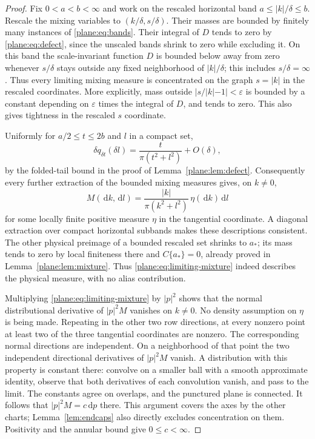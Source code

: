 \documentclass[11pt]{article}
\newcommand{\dd}{\,\mathrm d}
\theoremstyle{definition}
\theoremstyle{remark}
\numberwithin{equation}{section}
\begin{document}
\begin{proof}
Fix $0<a<b<\infty$ and work on the rescaled horizontal band
$a\le|k|/\delta\le b$.  Rescale the mixing variables to
$(k/\delta,s/\delta)$.  Their masses are bounded by finitely many
instances of \eqref{plane:eq:bands}.  Their integral of $D$ tends to
zero by \eqref{plane:eq:defect}, since the unscaled bands shrink to
zero while excluding it.  On this band the scale-invariant function
$D$ is bounded below away from zero whenever $s/\delta$ stays outside
any fixed neighborhood of $|k|/\delta$; this includes $s/\delta=\infty$.
Thus every limiting mixing measure is concentrated on the graph
$s=|k|$ in the rescaled coordinates.  More explicitly, mass outside
$|s/|k|-1|<\varepsilon$ is bounded by a constant depending on
$\varepsilon$ times the integral of $D$, and tends to zero.
This also gives tightness in the rescaled $s$ coordinate.

Uniformly for $a/2\le t\le2b$ and $l$ in a compact set,
\[
 \delta q_{\delta t}(\delta l)
     =\frac{t}{\pi(t^2+l^2)}+O(\delta),
\]
by the folded-tail bound in the proof of
Lemma~\ref{plane:lem:defect}.  Consequently every further extraction
of the bounded mixing measures gives, on $k\ne0$,
\begin{equation}
 \label{plane:eq:limiting-mixture}
 M(\dd k,\dd l)=
     \frac{|k|}{\pi(k^2+l^2)}\,\eta(\dd k)\dd l
\end{equation}
for some locally finite positive measure $\eta$ in the tangential
coordinate.  A diagonal extraction over compact horizontal subbands
makes these descriptions consistent.  The other physical preimage of
a bounded rescaled set shrinks to $a_*$; its mass tends to zero by
local finiteness there and $C\{a_*\}=0$, already proved in
Lemma~\ref{plane:lem:mixture}.  Thus \eqref{plane:eq:limiting-mixture}
indeed describes the physical measure, with no alias contribution.

Multiplying \eqref{plane:eq:limiting-mixture} by $|p|^2$ shows that
the normal distributional derivative of $|p|^2M$ vanishes on $k\ne0$.
No density assumption on $\eta$ is being made.  Repeating in the
other two row directions, at every nonzero point at least two
of the three tangential coordinates are nonzero.  The corresponding
normal directions are independent.  On a neighborhood of that point
the two independent directional derivatives of $|p|^2M$ vanish.
A distribution with this property is constant there: convolve on a
smaller ball with a smooth approximate identity, observe that both
derivatives of each convolution vanish, and pass to the limit.
The constants agree on overlaps, and the punctured plane is connected.
It follows that $|p|^2M=c\dd p$ there.  This argument covers the
axes by the other charts; Lemma~\ref{lem:endcaps} also directly
excludes concentration on them.  Positivity and the annular bound
give $0\le c<\infty$.
\end{proof}
\end{document}

